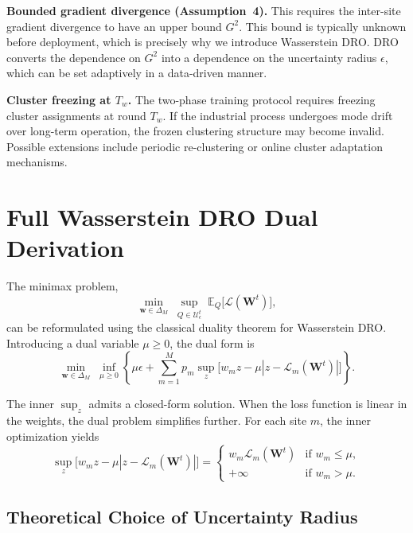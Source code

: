 \documentclass[10pt,journal,compsoc]{IEEEtran}
\begin{document}
\textbf{Bounded gradient divergence (Assumption~4).}
This requires the inter-site gradient divergence to have an upper bound $G^2$. This bound is typically unknown before deployment, which is precisely why we introduce Wasserstein DRO. DRO converts the dependence on $G^2$ into a dependence on the uncertainty radius $\epsilon$, which can be set adaptively in a data-driven manner.

\textbf{Cluster freezing at $T_w$.}
The two-phase training protocol requires freezing cluster assignments at round $T_w$. If the industrial process undergoes mode drift over long-term operation, the frozen clustering structure may become invalid. Possible extensions include periodic re-clustering or online cluster adaptation mechanisms.


\section{Full Wasserstein DRO Dual Derivation}
\label{sup:dro-dual}

The minimax problem,
\begin{equation}
\min_{\mathbf{w} \in \Delta_M} \; \sup_{Q \in \mathcal{U}_\epsilon^t} \; \mathbb{E}_{Q}\bigl[\mathcal{L}(\mathbf{W}^t)\bigr],
\end{equation}
can be reformulated using the classical duality theorem for Wasserstein DRO. Introducing a dual variable $\mu \geq 0$, the dual form is
\begin{equation}
\min_{\mathbf{w} \in \Delta_M} \; \inf_{\mu \geq 0} \left\{ \mu \epsilon + \sum_{m=1}^{M} p_m \sup_{z} \bigl[ w_m z - \mu |z - \mathcal{L}_m(\mathbf{W}^t)| \bigr] \right\}.
\end{equation}

The inner $\sup_z$ admits a closed-form solution. When the loss function is linear in the weights, the dual problem simplifies further. For each site $m$, the inner optimization yields
\begin{equation}
\sup_{z} \bigl[ w_m z - \mu |z - \mathcal{L}_m(\mathbf{W}^t)| \bigr] =
\begin{cases}
w_m \mathcal{L}_m(\mathbf{W}^t) & \text{if } w_m \leq \mu, \\
+\infty & \text{if } w_m > \mu.
\end{cases}
\end{equation}

\subsection{Theoretical Choice of Uncertainty Radius}
\end{document}
